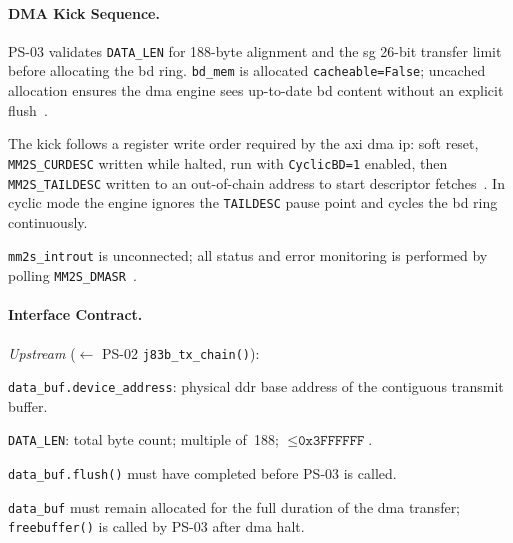 
\FloatBarrier
\paragraph{DMA Kick Sequence.}

PS-03 validates \texttt{DATA\_LEN} for 188-byte alignment and the
\ac{sg} 26-bit transfer limit before allocating the \ac{bd} ring.
\texttt{bd\_mem} is allocated \texttt{cacheable=False}; uncached
allocation ensures the \ac{dma} engine sees up-to-date \ac{bd}
content without an explicit flush~\cite{AMD_PG021}.

The kick follows a register write order required by the \ac{axi}
\ac{dma} \ac{ip}: soft reset, \texttt{MM2S\_CURDESC} written
while halted, run with \texttt{CyclicBD=1} enabled, then
\texttt{MM2S\_TAILDESC} written to an out-of-chain address to
start descriptor fetches~\cite{AMD_PG021}.
In cyclic mode the engine ignores the \texttt{TAILDESC} pause
point and cycles the \ac{bd} ring continuously.

\texttt{mm2s\_introut} is unconnected; all status and error
monitoring is performed by polling
\texttt{MM2S\_DMASR}~\cite{AMD_PG021}.


\FloatBarrier
\paragraph{Interface Contract.}

\textit{Upstream} ($\leftarrow$ PS-02 \texttt{j83b\_tx\_chain()}):
\begin{tightemize}
  \item \texttt{data\_buf.device\_address}: physical \ac{ddr} base
        address of the contiguous transmit buffer.
  \item \texttt{DATA\_LEN}: total byte count; multiple of~188;
        $\leq \texttt{0x3FFFFFF}$.
  \item \texttt{data\_buf.flush()} must have completed before
        PS-03 is called.
  \item \texttt{data\_buf} must remain allocated for the full
        duration of the \ac{dma} transfer; \texttt{freebuffer()}
        is called by PS-03 after \ac{dma} halt.
\end{tightemize}

